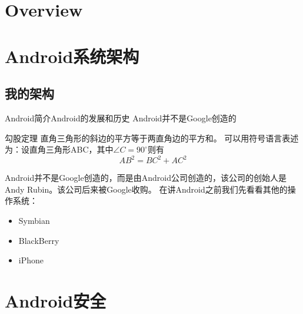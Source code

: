 \documentclass{beamer}
\begin{document}
\makeTitlePage

\section*{Overview}
  \frame {
    \frametitle{\secname}
    \tableofcontents[hideallsubsections]
}



\section{Android系统架构}  



\subsection{我的架构}



\begin{frame}{Android简介}{Android的发展和历史}  
Android并不是Google创造的
\begin{block}{勾股定理}  
直角三角形的斜边的平方等于两直角边的平方和。  
可以用符号语言表述为：设直角三角形ABC，其中$\angle C=90^\circ$则有  
\begin{equation}  
AB^2=BC^2+AC^2  
\end{equation}  
\end{block}  
Android并不是Google创造的，而是由Android公司创造的，该公司的创始人是Andy Rubin。该公司后来被Google收购。  
在讲Android之前我们先看看其他的操作系统：  
\begin{itemize}  
\item Symbian  
\item BlackBerry  
\item iPhone
\end{itemize}  
\end{frame}  

\section{Android安全} 
\end{document}
